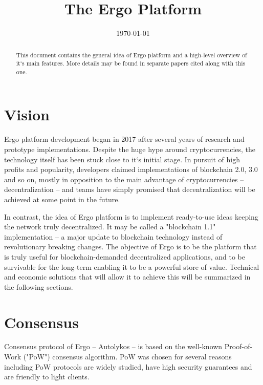 \documentclass[]{article}
\begin{document}
    \title{The Ergo Platform}

    \date{\today}
    \maketitle

    \begin{abstract}
        This document contains the general idea of Ergo platform and a high-level overview of it`s main
        features. More details may be found in separate papers cited along with this one.
    \end{abstract}

    \section{Vision}

    Ergo platform development began in 2017 after several years of research and prototype
    implementations. Despite the huge hype around cryptocurrencies, the technology itself has
    been stuck close to it`s initial stage. In pursuit of high profits and popularity, developers claimed
    implementations of blockchain 2.0, 3.0 and so on, mostly in opposition to the main advantage of
    cryptocurrencies -- decentralization -- and teams have simply promised that decentralization will
    be achieved at some point in the future.

    In contrast, the idea of Ergo platform is to implement ready-to-use ideas keeping the network
    truly decentralized. It may be called a "blockchain 1.1" implementation -- a major update to
    blockchain technology instead of revolutionary breaking changes. The objective of Ergo is to be
    the platform that is truly useful for blockchain-demanded decentralized applications, and to be
    survivable for the long-term enabling it to be a powerful store of value. Technical and economic
    solutions that will allow it to achieve this will be summarized in the following sections.

    \section{Consensus}

    Consensus protocol of Ergo -- Autolykos -- is based on the well-known Proof-of-Work ("PoW")
    consensus algorithm. PoW was chosen for several reasons including PoW protocols are widely
    studied, have high security guarantees and are friendly to light clients.
\end{document}
